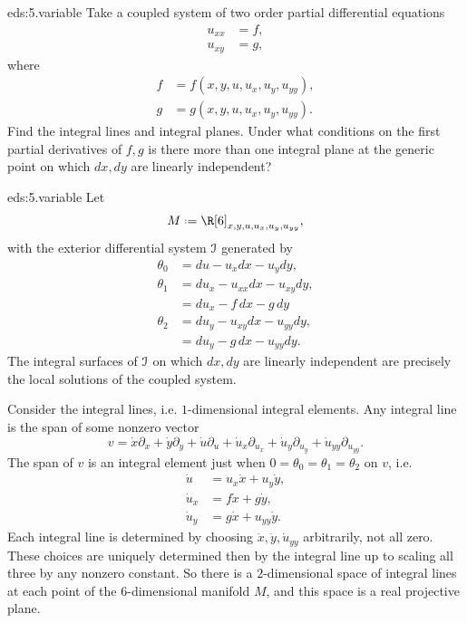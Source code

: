 \begin{problem*}{eds:5.variable}
Take a coupled system of two  order partial differential equations
\begin{align*}
u_{xx}&=f,\\
u_{xy}&=g,
\end{align*}
where
\begin{align*}
f&=f(x,y,u,u_x,u_y,u_{yy}),\\
g&=g(x,y,u,u_x,u_y,u_{yy}).
\end{align*}
Find the integral lines and integral planes.
Under what conditions on the first partial derivatives of \(f,g\) is there more than one integral plane at the generic point on which \(dx,dy\) are linearly independent?
\end{problem*}
\begin{answer}{eds:5.variable}
Let
\[
M\defeq\R[6]_{x,y,u,u_x,u_y,u_{yy}},
\]
with the exterior differential system \(\mathcal{I}\) generated by
\begin{align*}
\theta_0&=du-u_xdx-u_ydy,\\
\theta_1&=du_x-u_{xx}dx-u_{xy}dy,\\
&=du_x-f\,dx-g\,dy\\
\theta_2&=du_y-u_{xy}dx-u_{yy}dy,\\
&=du_y-g\,dx-u_{yy}dy.
\end{align*}
The integral surfaces of \(\mathcal{I}\) on which \(dx,dy\) are linearly independent are precisely the local solutions of the coupled system.

Consider the integral lines, i.e. \(1\)-dimensional integral elements.
Any integral line is the span of some nonzero vector
\[
v=
\dot{x}\partial_x+
\dot{y}\partial_y+
\dot{u}\partial_u+
\dot{u}_x\partial_{u_x}+
\dot{u}_y\partial_{u_y}+
\dot{u}_{yy}\partial_{u_{yy}}.
\]
The span of \(v\) is an integral element just when \(0=\theta_0=\theta_1=\theta_2\) on \(v\), i.e.
\begin{align*}
\dot{u}&=u_x\dot{x}+u_y\dot{y},\\
\dot{u}_x&=f\dot{x}+g\dot{y},\\
\dot{u}_y&=g\dot{x}+u_{yy}\dot{y}.
\end{align*}
Each integral line is determined by choosing \(\dot{x},\dot{y},\dot{u}_{yy}\) arbitrarily, not all zero.
These choices are uniquely determined then by the integral line up to scaling all three by any nonzero constant.
So there is a \(2\)-dimensional space of integral lines at each point of the \(6\)-dimensional manifold \(M\), and this space is a real projective plane.


\end{answer}
